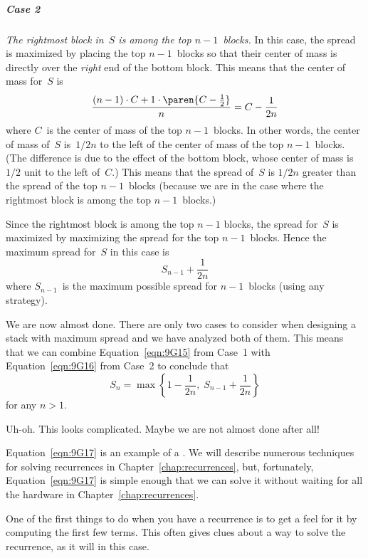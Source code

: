 \subparagraph{Case 2}

\emph{The rightmost block in~$S$ is among the top $n - 1$~blocks.}
In this case, the spread is maximized by placing the top $n -
1$~blocks so that their center of mass is directly over the
\emph{right} end of the bottom block.  This means that the center of
mass for~$S$ is
\begin{equation*}
    \frac{(n - 1) \cdot C + 1 \cdot \paren{C - \frac{1}{2}}}{n}
    = C - \frac{1}{2n}
\end{equation*}
where $C$~is the center of mass of the top $n - 1$~blocks.  In other
words, the center of mass of~$S$ is~$1/2n$ to the left of the center
of mass of the top $n - 1$~blocks.  (The difference is due to the
effect of the bottom block, whose center of mass is $1/2$ unit to the
left of~$C$.)  This means that the spread of~$S$ is $1/2n$ greater
than the spread of the top $n - 1$~blocks (because we are in the case
where the rightmost block is among the top $n - 1$~blocks.)

Since the rightmost block is among the top $n - 1$ blocks, the spread
for~$S$ is maximized by maximizing the spread for the top $n -
1$~blocks.  Hence the maximum spread for~$S$ in this case is
\begin{equation}\label{eqn:9G16}
    S_{n - 1} + \frac{1}{2n}
\end{equation}
where $S_{n - 1}$~is the maximum possible spread for $n - 1$~blocks
(using any strategy).

We are now almost done.  There are only two cases to consider when
designing a stack with maximum spread and we have analyzed both of
them.  This means that we can combine Equation~\ref{eqn:9G15} from
Case~1 with Equation~\ref{eqn:9G16} from Case~2 to conclude that
\begin{equation}\label{eqn:9G17}
    S_n = \max \left\{ 1 - \frac{1}{2n}, \; S_{n - 1} + \frac{1}{2n} \right\}
\end{equation}
for any $n > 1$.

Uh-oh. This looks complicated.  Maybe we are not almost done after
all!

Equation~\ref{eqn:9G17} is an example of a .  We will
describe numerous techniques for solving recurrences in
Chapter~\ref{chap:recurrences}, but, fortunately,
Equation~\ref{eqn:9G17} is simple enough that we can solve it without
waiting for all the hardware in Chapter~\ref{chap:recurrences}.

One of the first things to do when you have a recurrence is to get a
feel for it by computing the first few terms.  This often gives clues
about a way to solve the recurrence, as it will in this case.

